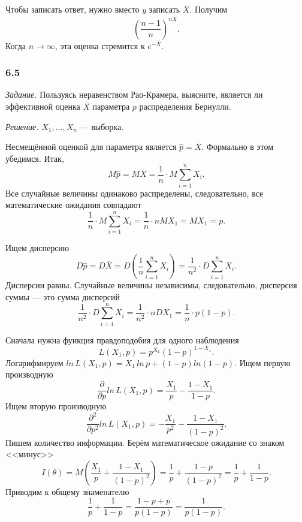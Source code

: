 Чтобы записать ответ, нужно вместо $y$ записать $ \overline{X}$.
Получим
$$ \left( \frac{n - 1}{n} \right)^{n \overline{X}}.$$
Когда $n \to \infty $, эта оценка стремится к $e^{- \overline{X}}$.

\subsubsection*{6.5}

\textit{Задание.}
Пользуясь неравенством Рао-Крамера, выясните,
является ли эффективной оценка $ \overline{X}$ параметра $p$ распределения Бернулли.

\textit{Решение.} $X_1, \dotsc, X_n$ --- выборка.

Несмещённой оценкой для параметра является $ \hat{p} = \overline{X}$.
Формально в этом убедимся.
Итак,
$$M \hat{p} =
  M \overline{X} =
  \frac{1}{n} \cdot M \sum \limits_{i = 1}^n X_i.$$
Все случайные величины одинаково распределены, следовательно, все математические ожидания совпадают
$$ \frac{1}{n} \cdot M \sum \limits_{i = 1}^n X_i =
  \frac{1}{n} \cdot n MX_1 =
  MX_1 =
  p.$$

Ищем дисперсию
$$D \hat{p} =
  D \overline{X} =
  D \left( \frac{1}{n} \sum \limits_{i = 1}^n X_i \right) =
  \frac{1}{n^2} \cdot D \sum \limits_{i = 1}^n X_i.$$
Дисперсии равны.
Случайные величины независимы, следовательно, дисперсия суммы --- это сумма дисперсий
$$ \frac{1}{n^2} \cdot D \sum \limits_{i = 1}^n X_i =
  \frac{1}{n^2} \cdot nDX_1 =
  \frac{1}{n} \cdot p \left( 1 - p \right).$$

Сначала нужна функция правдоподобия для одного наблюдения
$$L \left( X_1, p \right) =
  p^{X_1} \left( 1 - p \right)^{1 - X_1}.$$
Логарифмируем
$ln \, L \left( X_1, p \right) =
  X_1 \, ln \, p + \left( 1 - p \right) ln \left( 1 - p \right) $.
Ищем первую производную
$$ \frac{ \partial }{ \partial p} ln \, L \left( X_1, p \right) =
  \frac{X_1}{p} - \frac{1 - X_1}{1 - p}.$$
Ищем вторую производную
$$ \frac{ \partial^2}{ \partial p^2} ln \, L \left( X_1, p \right) =
  - \frac{X_1}{p^2} - \frac{1 - X_1}{ \left( 1 -p \right)^2}.$$
Пишем количество информации.
Берём математическое ожидание со знаком <<минус>>
$$I \left( \theta \right) =
  M \left( \frac{X_1}{p} + \frac{1 - X_1}{ \left( 1 - p \right)^2} \right) =
  \frac{1}{p} + \frac{1 - p}{ \left( 1 - p \right)^2} =
  \frac{1}{p} + \frac{1}{1 - p}.$$
Приводим к общему знаменателю
$$ \frac{1}{p} + \frac{1}{1 - p} =
  \frac{1 - p + p}{p \left( 1 - p \right) } =
  \frac{1}{p \left( 1 - p \right) }.$$

